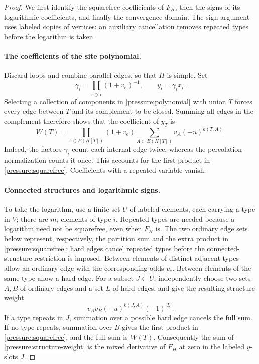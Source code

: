 \begin{proof}
We first identify the squarefree coefficients of $F_H$, then the signs
of its logarithmic coefficients, and finally the convergence domain.
The sign argument uses labeled copies of vertices: an auxiliary
cancellation removes repeated types before the logarithm is taken.

\paragraph{The coefficients of the site polynomial.}
Discard loops and combine parallel edges, so that $H$ is simple. Set
\[
 \gamma_i=\prod_{e\ni i}(1+v_e)^{-1},\qquad y_i=\gamma_i x_i.
\]
Selecting a collection of components in
\eqref{pressure:polynomial} with union $T$ forces every edge between $T$
and its complement to be closed. Summing all edges in the complement
therefore shows that the coefficient of $y_T$ is
\begin{equation}
 W(T)=\prod_{e\in E(H[T])}(1+v_e)
       \sum_{A\subset E(H[T])}v_A(-u)^{k(T,A)}.
 \label{pressure:squarefree}
\end{equation}
Indeed, the factors $\gamma_i$ count each internal edge twice, whereas
the percolation normalization counts it once. This accounts for the
first product in \eqref{pressure:squarefree}. Coefficients with a
repeated variable vanish.

\paragraph{Connected structures and logarithmic signs.}
To take the logarithm, use a finite set $U$ of labeled elements, each
carrying a type in $V$; there are $m_i$ elements of type $i$. Repeated
types are needed because a logarithm need not be squarefree, even when
$F_H$ is. The two ordinary edge sets below represent, respectively,
the partition sum and the extra product in
\eqref{pressure:squarefree}; hard edges cancel repeated types before
the connected-structure restriction is imposed. Between
elements of distinct adjacent types allow an ordinary edge with the
corresponding odds $v_e$. Between elements of the same type allow a
hard edge. For a subset $J\subset U$, independently choose two sets
$A,B$ of ordinary edges and a set $L$ of hard edges, and give the
resulting structure weight
\begin{equation}
 v_Av_B(-u)^{k(J,A)}(-1)^{|L|}.
 \label{pressure:structure-weight}
\end{equation}
If a type repeats in $J$, summation over a possible hard edge cancels
the full sum. If no type repeats, summation over $B$ gives the first
product in \eqref{pressure:squarefree}, and the full sum is $W(T)$.
Consequently the sum of \eqref{pressure:structure-weight} is the mixed
derivative of $F_H$ at zero in the labeled $y$-slots $J$.


\end{proof}
